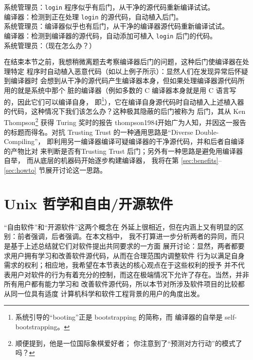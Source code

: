 \begin{quoting}
	系统管理员：\verb|login| 程序似乎有后门，从干净的源代码重新编译试试。\\
	编译器：检测到正在处理 \verb|login| 的源代码，自动植入后门。\\
	系统管理员：编译器似乎也有后门，从干净的编译器源代码重新编译试试。\\
	编译器：检测到编译器的源代码，自动添加可植入 \verb|login| 后门的代码。\\
	系统管理员：（现在怎么办？）
\end{quoting}\par
在结束本节之前，我想稍微离题去考察编译器后门的问题，这种后门使编译器在处理特定
程序时自动植入恶意代码（如以上例子所示）：显然人们在发现异常后怀疑到编译器时
会想到从干净的源代码产生编译器本身，但如果处理编译器源代码所用的就是系统中那个
脏的编译器（例如多数的 C 编译器本身就是用 C 语言写的，因此它们可以编译自身，
即\footnote{系统引导的“booting”正是 bootstrapping 的简称，而
编译器的自举是 self-bootstrapping。}），它在编译自身源代码时自动植入上述植入器
的代码，这种情况下我们该怎么办？这种极其隐蔽的后门被称为  后门，其从 Ken Thompson\footnote{顺便提到，他是一位国际象棋爱好者；
你注意到了“预测对方行动”的模式了吗？} 获得 Turing 奖时的报告\cupercite%
{thompson1984}开始广为人知，并因这一报告的标题而得名。对抗 Trusting Trust
的一种通用思路是“Diverse Double-Compiling”，
即利用另一编译器编译可疑编译器的干净源代码，并和后者自编译的产物比对
来判断是否有Trusting Trust 后门；另外有一种思路是避免用编译器自举，
而从底层的机器码开始逐步构建编译器，
我将在第 \ref{sec:benefits}--\ref{sec:howto} 节展开讨论这一思路。

\section{Unix 哲学和自由/开源软件}\label{sec:foss}

“自由软件”和“开源软件”这两个概念在
外延上很相近，但在内涵上又有明显的区别：前者强调，后者强调。在本文档中，
我不打算进一步分析两者的异同，而只是基于上述总结就它们对软件提出共同要求的一方面
展开讨论：显然，两者都要求用户拥有学习和改善软件源代码，从而在合理范围内调整软件
行为以满足自身需求的权利；相应地，我希望在本节表达的核心观点在于这些权利的授予
并不代表用户对软件的行为有着充分的控制，而这在极端情况下允许了存在。当然，并非所有用户都有能力学习和
改善软件源代码，所以本节对所涉及软件项目的比较都从同一位具有适度
计算机科学和软件工程背景的用户的角度出发。

